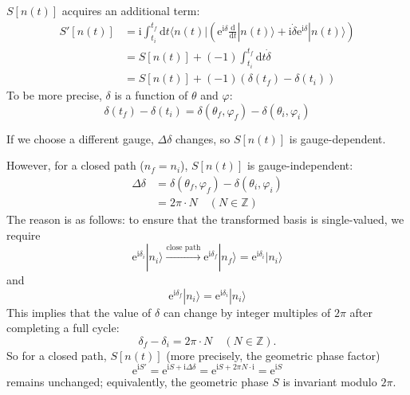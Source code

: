 $S[n(t)]$ acquires an additional term:
\begin{equation}
\begin{aligned}
S'[n(t)] &= \mathrm{i} \int_{t_i}^{t_f} \mathrm{d}t \langle n(t)| ( \mathrm{e}^{\mathrm{i}\delta} \frac{\mathrm{d}}{\mathrm{d}t} |n(t)\rangle + \mathrm{i}\dot{\delta} \mathrm{e}^{\mathrm{i}\delta} |n(t)\rangle ) \\
&= S[n(t)] + (-1) \int_{t_i}^{t_f} \mathrm{d}t \dot{\delta} \\
&= S[n(t)] + (-1) (\delta(t_f) - \delta(t_i))
\end{aligned}
\end{equation}
To be more precise, $\delta$ is a function of $\theta$ and $\varphi$:
\begin{equation}
\delta(t_f) - \delta(t_i) = \delta(\theta_f, \varphi_f) - \delta(\theta_i, \varphi_i)
\end{equation}

If we choose a different gauge, $\Delta\delta$ changes,
so $S[n(t)]$ is gauge-dependent.



However, for a closed path ($n_f=n_i$), $S[n(t)]$ is
gauge-independent:
\begin{equation}
\begin{aligned}
\Delta\delta &= \delta(\theta_f, \varphi_f) - \delta(\theta_i, \varphi_i) \\
&= 2\pi \cdot N \quad (N \in \mathbb{Z})
\end{aligned}
\end{equation}
The reason is as follows: to ensure that the transformed
basis is single-valued, we require
\begin{equation}
\mathrm{e}^{\mathrm{i}\delta_i} |n_i\rangle \xrightarrow{\text{close path}} \mathrm{e}^{\mathrm{i}\delta_f} |n_f\rangle = \mathrm{e}^{\mathrm{i}\delta_i} |n_i\rangle
\end{equation}
and
\begin{equation}
\mathrm{e}^{\mathrm{i}\delta_f} |n_i\rangle = \mathrm{e}^{\mathrm{i}\delta_i} |n_i\rangle
\end{equation}
This implies that the value of $\delta$ can change by
integer multiples of $2\pi$ after completing a full cycle:
\begin{equation}
\delta_f - \delta_i = 2\pi \cdot N \quad (N \in \mathbb{Z}).
\end{equation}
So for a closed path, $S[n(t)]$ (more precisely, the geometric phase factor)
\begin{equation}
\mathrm{e}^{\mathrm{i}S'} = \mathrm{e}^{\mathrm{i}S+\mathrm{i}\Delta\delta} = \mathrm{e}^{\mathrm{i}S+2\pi N \cdot \mathrm{i}} = \mathrm{e}^{\mathrm{i}S}
\end{equation}
remains unchanged; equivalently, the geometric phase $S$ is
invariant modulo $2\pi$.

